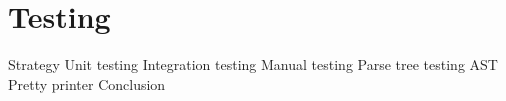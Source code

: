 \chapter{Testing}

Strategy
	Unit testing
	Integration testing 
Manual testing
	Parse tree testing
	AST Pretty printer
Conclusion